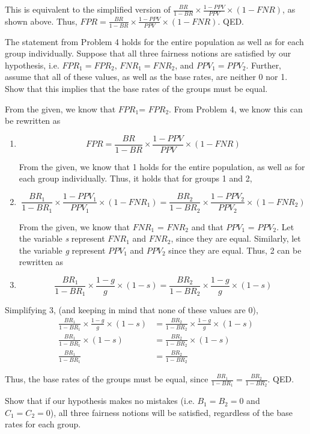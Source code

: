 \documentclass{cisXXX} %
\begin{document}
This is equivalent to the simplified version of $\frac{BR}{1-BR}\times\frac{1-PPV}{PPV}\times(1 -FNR)$, as shown above. Thus, $FPR = \frac{BR}{1-BR}\times\frac{1-PPV}{PPV}\times(1 -FNR)$. QED.

\HWproblem
The statement from Problem 4 holds for the entire population as well as for each group individually. Suppose that all three fairness notions are satisfied by our hypothesis, i.e. $FPR_1 = FPR_2$, $FNR_1 = FNR_2$, and $PPV_1 = PPV_2$. Further, assume that all of these values, as well as the base rates, are neither 0 nor 1. Show that this implies that the base rates of the groups must be equal.

From the given, we know that $FPR_1 $= $FPR_2$. From Problem 4, we know this can be rewritten as
\begin{enumerate}
\item $$FPR = \frac{BR}{1-BR}\times\frac{1-PPV}{PPV}\times(1 -FNR)$$

From the given, we know that 1 holds for the entire population, as well as for each group individually. Thus, it holds that for groups 1 and 2,
\item $$\frac{BR_1}{1-BR_1}\times\frac{1-PPV_1}{PPV_1}\times(1 -FNR_1) = \frac{BR_2}{1-BR_2}\times\frac{1-PPV_2}{PPV_2}\times(1 -FNR_2)$$

From the given, we know that $FNR_1$ = $FNR_2$ and that $PPV_1$ = $PPV_2$. Let the variable \textit{s} represent $FNR_1$ and $FNR_2$, since they are equal. Similarly, let the variable \textit{g} represent $PPV_1$ and $PPV_2$ since they are equal. Thus, 2 can be rewritten as
\item $$\frac{BR_1}{1-BR_1}\times\frac{1-g}{g}\times(1 -s) = \frac{BR_2}{1-BR_2}\times\frac{1-g}{g}\times(1 -s)$$
\end{enumerate}

Simplifying 3, (and keeping in mind that none of these values are 0),
\begin{align}
\frac{BR_1}{1-BR_1}\times\frac{1-g}{g}\times(1 -s) &= \frac{BR_2}{1-BR_2}\times\frac{1-g}{g}\times(1 -s)\\
\frac{BR_1}{1-BR_1}\times(1 -s) &= \frac{BR_2}{1-BR_2}\times(1 -s)\\
\frac{BR_1}{1-BR_1} &= \frac{BR_2}{1-BR_2}
\end{align}

Thus, the base rates of the groups must be equal, since $\frac{BR_1}{1-BR_1} = \frac{BR_2}{1-BR_2}$. QED.


\HWproblem
Show that if our hypothesis makes no mistakes (i.e. $B_1 = B_2 = 0$ and $C_1 = C_2 = 0$), all three fairness notions will be satisfied, regardless of the base rates for each group.
\end{document}
